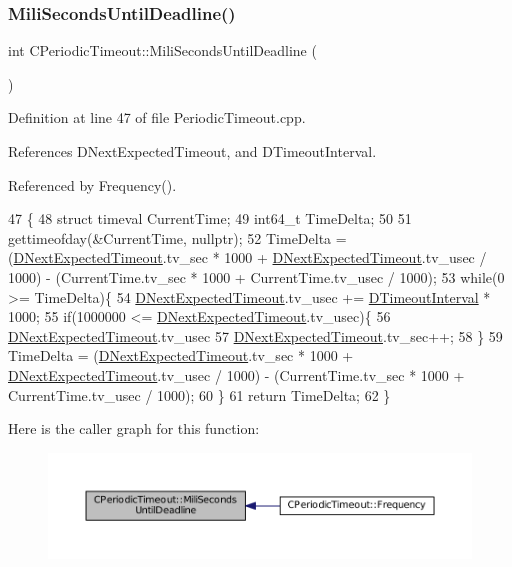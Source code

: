 \subsubsection{\texorpdfstring{Mili\+Seconds\+Until\+Deadline()}{MiliSecondsUntilDeadline()}}
{\footnotesize\ttfamily int C\+Periodic\+Timeout\+::\+Mili\+Seconds\+Until\+Deadline (\begin{DoxyParamCaption}{ }\end{DoxyParamCaption})}



Definition at line 47 of file Periodic\+Timeout.\+cpp.



References D\+Next\+Expected\+Timeout, and D\+Timeout\+Interval.



Referenced by Frequency().


\begin{DoxyCode}
47                                               \{
48     \textcolor{keyword}{struct }timeval CurrentTime;
49     int64\_t TimeDelta;
50     
51     gettimeofday(&CurrentTime, \textcolor{keyword}{nullptr});
52     TimeDelta = (\hyperlink{classCPeriodicTimeout_ae85c3dd7526ee6b538b7c6478133013c}{DNextExpectedTimeout}.tv\_sec * 1000 + 
      \hyperlink{classCPeriodicTimeout_ae85c3dd7526ee6b538b7c6478133013c}{DNextExpectedTimeout}.tv\_usec / 1000) - (CurrentTime.tv\_sec * 1000 + CurrentTime.tv\_usec
       / 1000);
53     \textcolor{keywordflow}{while}(0 >= TimeDelta)\{
54         \hyperlink{classCPeriodicTimeout_ae85c3dd7526ee6b538b7c6478133013c}{DNextExpectedTimeout}.tv\_usec += \hyperlink{classCPeriodicTimeout_ab0c2b821c02366c9638a66eced3c1f34}{DTimeoutInterval} * 1000;
55         \textcolor{keywordflow}{if}(1000000 <= \hyperlink{classCPeriodicTimeout_ae85c3dd7526ee6b538b7c6478133013c}{DNextExpectedTimeout}.tv\_usec)\{
56             \hyperlink{classCPeriodicTimeout_ae85c3dd7526ee6b538b7c6478133013c}{DNextExpectedTimeout}.tv\_usec %
57             \hyperlink{classCPeriodicTimeout_ae85c3dd7526ee6b538b7c6478133013c}{DNextExpectedTimeout}.tv\_sec++;
58         \}
59         TimeDelta = (\hyperlink{classCPeriodicTimeout_ae85c3dd7526ee6b538b7c6478133013c}{DNextExpectedTimeout}.tv\_sec * 1000 + 
      \hyperlink{classCPeriodicTimeout_ae85c3dd7526ee6b538b7c6478133013c}{DNextExpectedTimeout}.tv\_usec / 1000) - (CurrentTime.tv\_sec * 1000 + CurrentTime.tv\_usec
       / 1000);
60     \}
61     \textcolor{keywordflow}{return} TimeDelta;
62 \}
\end{DoxyCode}
Here is the caller graph for this function\+:\nopagebreak
\begin{figure}[H]
\begin{center}
\leavevmode
\includegraphics[width=350pt]{classCPeriodicTimeout_a5d32d0a29ba5efa718f3489cb9fb2340_icgraph}
\end{center}
\end{figure}


